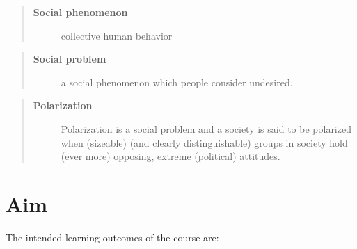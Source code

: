 \documentclass[
]{book}
\begin{document}
\begin{quote}
\begin{description}
\item[\textbf{Social phenomenon}]
collective human behavior
\end{description}
\end{quote}

\begin{quote}
\begin{description}
\item[\textbf{Social problem}]
a social phenomenon which people consider undesired.
\end{description}
\end{quote}

\begin{quote}
\begin{description}
\item[\textbf{Polarization}]
Polarization is a social problem and a society is said to be polarized when (sizeable) (and clearly distinguishable) groups in society hold (ever more) opposing, extreme (political) attitudes.
\end{description}
\end{quote}

\hypertarget{aim}{%
\section{Aim}\label{aim}}

The intended learning outcomes of the course are:
\end{document}
